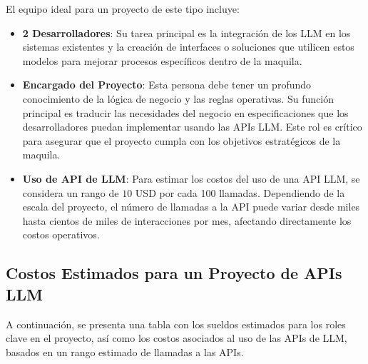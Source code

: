 El equipo ideal para un proyecto de este tipo incluye:

\begin{itemize}
    \item \textbf{2 Desarrolladores}: Su tarea principal es la integración de los LLM en los sistemas existentes y la creación de interfaces o soluciones que utilicen estos modelos para mejorar procesos específicos dentro de la maquila. 
    \item \textbf{Encargado del Proyecto}: Esta persona debe tener un profundo conocimiento de la lógica de negocio y las reglas operativas. Su función principal es traducir las necesidades del negocio en especificaciones que los desarrolladores puedan implementar usando las APIs LLM. Este rol es crítico para asegurar que el proyecto cumpla con los objetivos estratégicos de la maquila.
    \item \textbf{Uso de API de LLM}: Para estimar los costos del uso de una API LLM, se considera un rango de $10$ USD por cada 100 llamadas. Dependiendo de la escala del proyecto, el número de llamadas a la API puede variar desde miles hasta cientos de miles de interacciones por mes, afectando directamente los costos operativos.
\end{itemize}

\subsection{Costos Estimados para un Proyecto de APIs LLM}

A continuación, se presenta una tabla con los sueldos estimados para los roles clave en el proyecto, así como los costos asociados al uso de las APIs de LLM, basados en un rango estimado de llamadas a las APIs.

